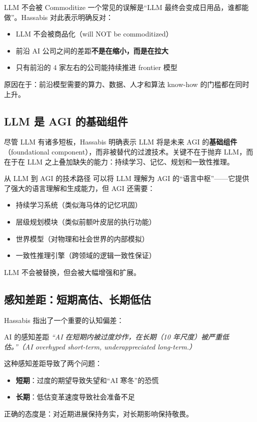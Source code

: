 \documentclass[a4paper]{article}
\begin{document}
\begin{warningbox}{LLM 不会被 Commoditize}
一个常见的误解是``LLM 最终会变成日用品，谁都能做''。Hassabis 对此表示明确反对：
\begin{itemize}
    \item LLM 不会被商品化（will NOT be commoditized）
    \item 前沿 AI 公司之间的差距\textbf{不是在缩小，而是在拉大}
    \item 只有前沿的 4 家左右的公司能持续推进 frontier 模型
\end{itemize}
原因在于：前沿模型需要的算力、数据、人才和算法 know-how 的门槛都在同时上升。
\end{warningbox}

\subsection{LLM 是 AGI 的基础组件}

尽管 LLM 有诸多短板，Hassabis 明确表示 LLM 将是未来 AGI 的\textbf{基础组件}（foundational component），而非被替代的过渡技术。关键不在于抛弃 LLM，而在于在 LLM 之上叠加缺失的能力：持续学习、记忆、规划和一致性推理。

\begin{knowledgebox}{从 LLM 到 AGI 的技术路径}
可以将 LLM 理解为 AGI 的``语言中枢''——它提供了强大的语言理解和生成能力，但 AGI 还需要：
\begin{itemize}
    \item 持续学习系统（类似海马体的记忆巩固）
    \item 层级规划模块（类似前额叶皮层的执行功能）
    \item 世界模型（对物理和社会世界的内部模拟）
    \item 一致性推理引擎（跨领域的逻辑一致性保证）
\end{itemize}
LLM 不会被替换，但会被大幅增强和扩展。
\end{knowledgebox}

\subsection{感知差距：短期高估、长期低估}

Hassabis 指出了一个重要的认知偏差：

\begin{importantbox}{AI 的感知差距}
\textit{``AI 在短期内被过度炒作，在长期（10 年尺度）被严重低估。''（AI overhyped short-term, underappreciated long-term.）}

这种感知差距导致了两个问题：
\begin{itemize}
    \item \textbf{短期}：过度的期望导致失望和``AI 寒冬''的恐慌
    \item \textbf{长期}：低估变革速度导致社会准备不足
\end{itemize}
正确的态度是：对近期进展保持务实，对长期影响保持敬畏。
\end{importantbox}
\end{document}
